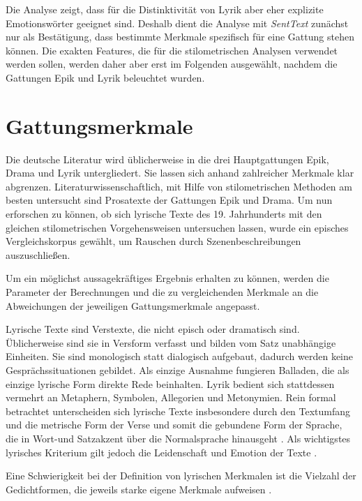 \documentclass[a4paper,10p]{article}
\begin{document}
Die Analyse zeigt, dass für die Distinktivität von Lyrik aber eher explizite Emotionswörter geeignet sind. Deshalb dient die Analyse mit \textit{SentText} zunächst nur als Bestätigung, dass bestimmte Merkmale spezifisch für eine Gattung stehen können. Die exakten Features, die für die stilometrischen Analysen verwendet werden sollen, werden daher aber erst im Folgenden ausgewählt, nachdem die Gattungen Epik und Lyrik beleuchtet wurden.\par 


\section{Gattungsmerkmale}
Die deutsche Literatur wird üblicherweise in die drei Hauptgattungen Epik, Drama und Lyrik untergliedert. Sie lassen sich anhand zahlreicher Merkmale klar abgrenzen. Literaturwissenschaftlich, mit Hilfe von stilometrischen Methoden am besten untersucht sind Prosatexte der Gattungen Epik und Drama. Um nun erforschen zu können, ob sich lyrische Texte des 19. Jahrhunderts mit den gleichen stilometrischen Vorgehensweisen untersuchen lassen, wurde ein episches Vergleichskorpus gewählt, um Rauschen durch Szenenbeschreibungen auszuschließen. \par 

Um ein möglichst aussagekräftiges Ergebnis erhalten zu können, werden die Parameter der Berechnungen und die zu vergleichenden Merkmale an die Abweichungen der jeweiligen Gattungsmerkmale angepasst. \par 

Lyrische Texte sind Verstexte, die nicht episch oder dramatisch sind. Üblicherweise sind sie in Versform verfasst und bilden vom Satz unabhängige Einheiten. Sie sind monologisch statt dialogisch aufgebaut, dadurch werden keine Gesprächssituationen gebildet. Als einzige Ausnahme fungieren Balladen, die als einzige lyrische Form direkte Rede beinhalten. Lyrik bedient sich stattdessen vermehrt an Metaphern, Symbolen, Allegorien und Metonymien. Rein formal betrachtet unterscheiden sich lyrische Texte insbesondere durch den Textumfang und die metrische Form der Verse und somit die gebundene Form der Sprache, die in Wort-und Satzakzent über die Normalsprache hinausgeht \citep[vgl.][S. 111]{Krah2006}. Als wichtigstes lyrisches Kriterium gilt jedoch die Leidenschaft und Emotion der Texte \citep[vgl.][S. 462-464]{SchweikleGunther;Burdorf2007}. \par 

Eine Schwierigkeit bei der Definition von lyrischen Merkmalen ist die Vielzahl der Gedichtformen, die jeweils starke eigene Merkmale aufweisen \citep[vgl.][S. 119]{Krah2006}. \par 
\end{document}
